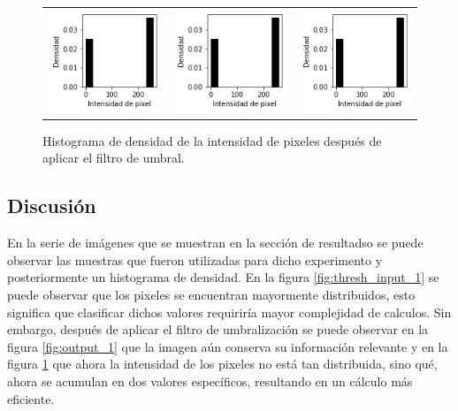 \begin{figure}[!h]
\begin{tabular}{ccc}
        \includegraphics[width=4cm]{../Plots/THR/threshold_output_12.png} &
        \includegraphics[width=4cm]{../Plots/THR/threshold_output_13.png} &
        \includegraphics[width=4cm]{../Plots/THR/threshold_output_14.png} \\

    \end{tabular}        
    \caption{Histograma de densidad de la intensidad de pixeles después de aplicar el filtro de umbral.}
    \label{fig:thresh_out_1}
\end{figure}

\subsection{Discusión}
En la serie de imágenes que se muestran en la sección de resultadso se puede observar las muestras que fueron utilizadas para dicho experimento y posteriormente un histograma de densidad. En la figura \ref{fig:thresh_input_1} se puede observar que los pixeles se encuentran mayormente distribuidos, esto significa que clasificar dichos valores requiriría mayor complejidad de calculos. Sin embargo, después de aplicar el filtro de umbralización se puede observar en la figura \ref{fig:output_1} que la imagen aún conserva su información relevante y en la figura \ref{fig:thresh_out_1} que ahora la intensidad de los pixeles no está tan distribuida, sino qué, ahora se acumulan en dos valores específicos, resultando en un cálculo más eficiente.

